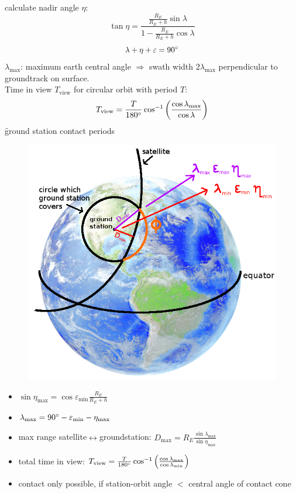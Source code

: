 calculate nadir angle $\eta$:
\[ \tan \eta = \frac{\frac{R_E}{R_E+h}\sin \lambda}{1-\frac{R_E}{R_E+h}\cos\lambda}\]
\[ \lambda + \eta + \varepsilon = 90\degree \]
$\lambda_\text{max}$: maximum earth central angle $\Rightarrow$ swath width $2\lambda_\text{max}$ perpendicular to groundtrack on surface.\\
Time in view $T_\text{view}$ for circular orbit with period $T$:
\[ T_\text{view} = \frac{T}{180\degree}\cos^{-1}\left(\frac{\cos \lambda_\text{max}}{\cos \lambda}\right)\]
\f{ground station contact periods}
\begin{figure}[!ht]
 \centering
 \includegraphics[scale=0.4]{task42}
\end{figure}
\begin{itemize}
 \item $\sin\eta_\text{max} = \cos \varepsilon_\text{min}\frac{R_E}{R_E+h}$
 \item $\lambda_\text{max} = 90\degree - \varepsilon_\text{min} -\eta_\text{max}$
 \item max range satellite$\leftrightarrow$groundstation: $D_\text{max} = R_E\frac{\sin\lambda_\text{max}}{\sin\eta_\text{max}}$
 \item total time in view: $ T_\text{view} = \frac{T}{180\degree}\cos^{-1}\left(\frac{\cos \lambda_\text{max}}{\cos \lambda_\text{min}}\right)$
 \item contact only possible, if station-orbit angle $<$ central angle of contact cone
\end{itemize}


